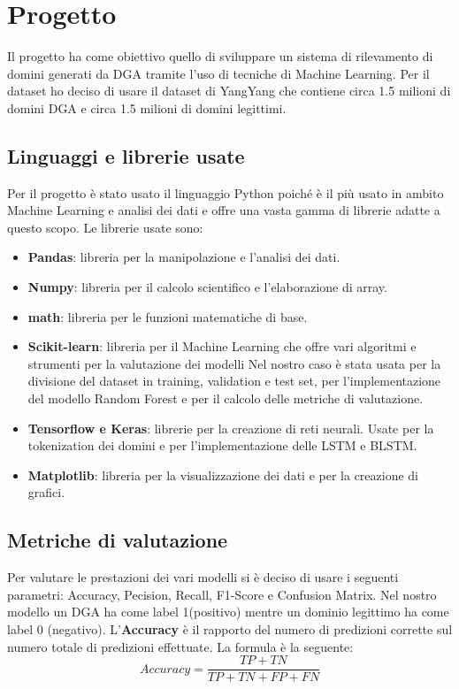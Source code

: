 \documentclass[12pt,a4paper,openright,twoside]{book}
\begin{document}
\chapter{Progetto}
Il progetto ha come obiettivo quello di sviluppare un sistema
di rilevamento di domini generati da \acrshort{DGA} tramite
l'uso di tecniche di Machine Learning. 
Per il dataset ho deciso di usare il dataset di YangYang \cite{dataset_yangyang}
che contiene circa 1.5 milioni di domini \acrshort{DGA} e circa 1.5 milioni di domini legittimi.

\section{Linguaggi e librerie usate}
Per il progetto è stato usato il linguaggio Python poiché è il più usato
in ambito Machine Learning e analisi dei dati e offre una vasta gamma di librerie
adatte a questo scopo. Le librerie usate sono:
\begin{itemize}
    \item \textbf{Pandas}: libreria per la manipolazione e l'analisi dei dati.
    \item \textbf{Numpy}: libreria per il calcolo scientifico e l'elaborazione di array.
    \item \textbf{math}: libreria per le funzioni matematiche di base.
    \item \textbf{Scikit-learn}: libreria per il Machine Learning che offre vari algoritmi
    e strumenti per la valutazione dei modelli Nel nostro caso è stata usata per 
    la divisione del dataset in training, validation e test set,
    per l'implementazione del modello Random Forest e per il calcolo delle metriche di valutazione.
    \item \textbf{Tensorflow e Keras}: librerie per la creazione di reti neurali. Usate per la
    tokenization dei domini e per l'implementazione delle LSTM e BLSTM.
    \item \textbf{Matplotlib}: libreria per la visualizzazione dei dati e per la creazione di grafici.
\end{itemize}

\section{Metriche di valutazione}
Per valutare le prestazioni dei vari modelli si è deciso di usare i seguenti
parametri:
Accuracy, Pecision, Recall, F1-Score e Confusion Matrix. \hfill \break
Nel nostro modello un DGA ha come label 1(positivo) mentre un dominio legittimo ha come label 0 (negativo).
L'\textbf{Accuracy} è il rapporto del numero di predizioni
corrette sul numero totale di predizioni effettuate.
La formula è la seguente:
\begin{equation}
    Accuracy = \frac{TP + TN}{TP + TN + FP + FN}
\end{equation}
\end{document}
